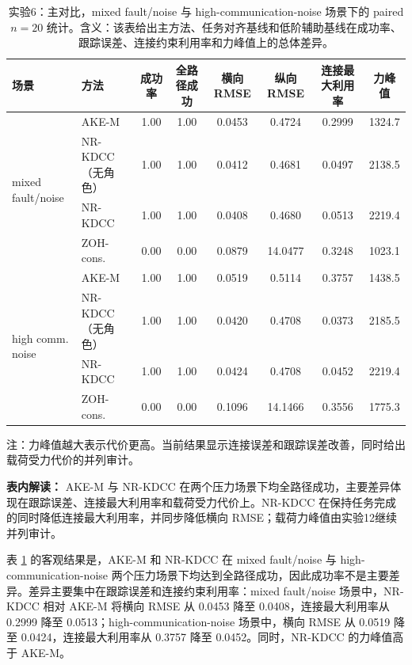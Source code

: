 \documentclass[twocolumn,3p,times,procedia]{elsarticle}
\newcommand{\AKE}{AKE-M}
\newcommand{\Method}{NR-KDCC}
\newcommand{\TF}{\Method{}}
\begin{document}
\begin{table}[!t]
\centering
\caption{实验6：主对比，mixed fault/noise 与 high-communication-noise 场景下的 paired $n=20$ 统计。含义：该表给出主方法、任务对齐基线和低阶辅助基线在成功率、跟踪误差、连接约束利用率和力峰值上的总体差异。}
\label{tab:e0_main}
\footnotesize
\begin{tabular}{llcccccc}
\toprule
场景 & 方法 & 成功率 & 全路径成功 & 横向 RMSE & 纵向 RMSE & 连接最大利用率 & 力峰值 \\
\midrule
\multirow{4}{*}{mixed fault/noise}
& \AKE{} & 1.00 & 1.00 & 0.0453 & 0.4724 & 0.2999 & 1324.7\\
& \Method{}（无角色） & 1.00 & 1.00 & 0.0412 & 0.4681 & 0.0497 & 2138.5\\
& \TF{} & 1.00 & 1.00 & 0.0408 & 0.4680 & 0.0513 & 2219.4\\
& ZOH-cons. & 0.00 & 0.00 & 0.0879 & 14.0477 & 0.3248 & 1023.1\\
\midrule
\multirow{4}{*}{high comm. noise}
& \AKE{} & 1.00 & 1.00 & 0.0519 & 0.5114 & 0.3757 & 1438.5\\
& \Method{}（无角色） & 1.00 & 1.00 & 0.0420 & 0.4708 & 0.0373 & 2185.5\\
& \TF{} & 1.00 & 1.00 & 0.0424 & 0.4708 & 0.0452 & 2219.4\\
& ZOH-cons. & 0.00 & 0.00 & 0.1096 & 14.1466 & 0.3556 & 1775.3\\
\bottomrule
\end{tabular}
\begin{tablenotes}
\footnotesize
\item 注：力峰值越大表示代价更高。当前结果显示连接误差和跟踪误差改善，同时给出载荷受力代价的并列审计。
\end{tablenotes}
\vspace{1.5mm}
\begin{minipage}{0.93\textwidth}
\footnotesize
\textbf{表内解读：} \AKE{} 与 \Method{} 在两个压力场景下均全路径成功，主要差异体现在跟踪误差、连接最大利用率和载荷受力代价上。\Method{} 在保持任务完成的同时降低连接最大利用率，并同步降低横向 RMSE；载荷力峰值由实验12继续并列审计。
\end{minipage}
\end{table}

表 \ref{tab:e0_main} 的客观结果是，\AKE{} 和 \Method{} 在 mixed fault/noise 与 high-communication-noise 两个压力场景下均达到全路径成功，因此成功率不是主要差异。差异主要集中在跟踪误差和连接约束利用率：mixed fault/noise 场景中，\Method{} 相对 \AKE{} 将横向 RMSE 从 0.0453 降至 0.0408，连接最大利用率从 0.2999 降至 0.0513；high-communication-noise 场景中，横向 RMSE 从 0.0519 降至 0.0424，连接最大利用率从 0.3757 降至 0.0452。同时，\Method{} 的力峰值高于 \AKE{}。
\end{document}
